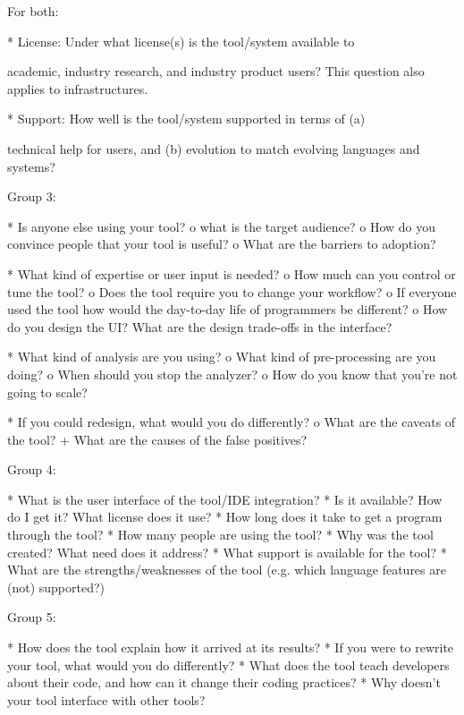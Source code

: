 {For both:

    * License: Under what license(s) is the tool/system available to 

academic, industry research, and industry product users? This question also applies to infrastructures.

    * Support: How well is the tool/system supported in terms of (a) 

technical help for users, and (b) evolution to match evolving languages and systems?

Group 3:

    * Is anyone else using your tool?
          o what is the target audience?
          o How do you convince people that your tool is useful?
          o What are the barriers to adoption? 

    * What kind of expertise or user input is needed?
          o How much can you control or tune the tool?
          o Does the tool require you to change your workflow?
          o If everyone used the tool how would the day-to-day life of programmers be different?
          o How do you design the UI? What are the design trade-offs in the interface? 

    * What kind of analysis are you using?
          o What kind of pre-processing are you doing?
          o When should you stop the analyzer?
          o How do you know that you're not going to scale? 

    * If you could redesign, what would you do differently?
          o What are the caveats of the tool?
                + What are the causes of the false positives? 

Group 4:

    * What is the user interface of the tool/IDE integration?
    * Is it available? How do I get it? What license does it use?
    * How long does it take to get a program through the tool?
    * How many people are using the tool?
    * Why was the tool created? What need does it address?
    * What support is available for the tool?
    * What are the strengths/weaknesses of the tool (e.g. which language features are (not) supported?) 

Group 5:

    * How does the tool explain how it arrived at its results?
    * If you were to rewrite your tool, what would you do differently?
    * What does the tool teach developers about their code, and how can it change their coding practices?
    * Why doesn't your tool interface with other tools? 


}
